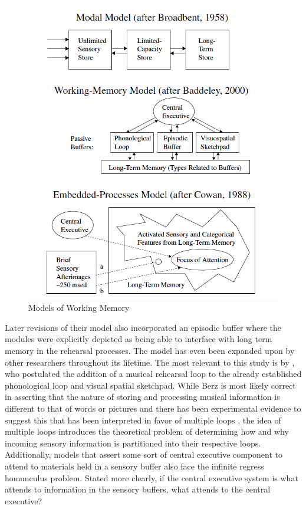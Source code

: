 \documentclass[12pt,]{book}
\begin{document}
\begin{figure}

{\centering \includegraphics[width=1\linewidth]{img/wm_models} 

}

\caption{Models of Working Memory}\label{fig:wmmodels}
\end{figure}

Later revisions of their model also incorporated an episodic buffer \citep{baddeleyEpisodicBufferNew2000} where the modules were explicitly depicted as being able to interface with long term memory in the rehearsal processes.
The model has even been expanded upon by other researchers throughout its lifetime.
The most relevant to this study is by \citet{berzWorkingMemoryMusic1995}, who postulated the addition of a musical rehearsal loop to the already established phonological loop and visual spatial sketchpad.
While Berz is most likely correct in asserting that the nature of storing and processing musical information is different to that of words or pictures and there has been experimental evidence to suggest this \citep{williamsonMusiciansNonmusiciansShortterm2010} that has been interpreted in favor of multiple loops \citep{wollnerAttentionalFlexibilityMemory2016}, the idea of multiple loops introduces the theoretical problem of determining how and why incoming sensory information is partitioned into their respective loops.
Additionally, models that assert some sort of central executive component to attend to materials held in a sensory buffer also face the infinite regress homunculus problem.
Stated more clearly, if the central executive system is what attends to information in the sensory buffers, what attends to the central executive?
\end{document}
